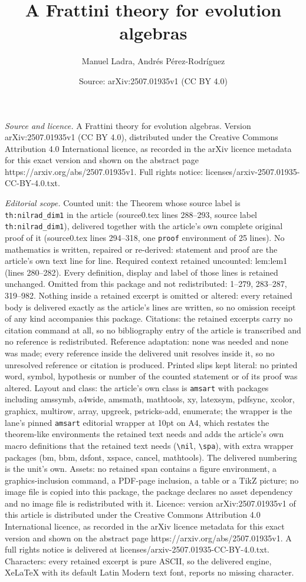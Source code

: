 \documentclass[10pt,a4paper]{amsart}
\title[A Frattini theory for evolution algebras]{A Frattini theory for evolution algebras}
\author{Manuel Ladra, Andr\'es P\'erez-Rodr\'iguez}
\date{Source: arXiv:2507.01935v1 (CC BY 4.0)}
\begin{document}
\maketitle

\noindent\emph{Source and licence.} A Frattini theory for evolution algebras. Version arXiv:2507.01935v1 (CC BY 4.0), distributed under the Creative Commons Attribution 4.0 International licence, as recorded in the arXiv licence metadata for this exact version and shown on the abstract page https://arxiv.org/abs/2507.01935v1. Full rights notice: licenses/arxiv-2507.01935-CC-BY-4.0.txt.\par\smallskip

\noindent\textit{Editorial scope.} Counted unit: the Theorem whose source label is \texttt{th:nilrad\_dim1} in the article (source0.tex lines 288--293, source label \texttt{th:nilrad\_dim1}), delivered together with the article's own complete original proof of it (source0.tex lines 294--318, one \texttt{proof} environment of 25 lines). No mathematics is written, repaired or re-derived: statement and proof are the article's own text line for line. Required context retained uncounted: lem:lem1 (lines 280--282). Every definition, display and label of those lines is retained unchanged. Omitted from this package and not redistributed: 1--279, 283--287, 319--982. Nothing inside a retained excerpt is omitted or altered: every retained body is delivered exactly as the article's lines are written, so no omission receipt of any kind accompanies this package. Citations: the retained excerpts carry no citation command at all, so no bibliography entry of the article is transcribed and no reference is redistributed. Reference adaptation: none was needed and none was made; every reference inside the delivered unit resolves inside it, so no unresolved reference or citation is produced. Printed slips kept literal: no printed word, symbol, hypothesis or number of the counted statement or of its proof was altered. Layout and class: the article's own class is \texttt{amsart} with packages including amssymb, a4wide, amsmath, mathtools, xy, latexsym, pdfsync, xcolor, graphicx, multirow, array, upgreek, pstricks-add, enumerate; the wrapper is the lane's pinned \texttt{amsart} editorial wrapper at 10pt on A4, which restates the theorem-like environments the retained text needs and adds the article's own macro definitions that the retained text needs (\texttt{\textbackslash nil}, \texttt{\textbackslash spa}), with extra wrapper packages (bm, bbm, dsfont, xspace, cancel, mathtools). The delivered numbering is the unit's own. Assets: no retained span contains a figure environment, a graphics-inclusion command, a PDF-page inclusion, a table or a TikZ picture; no image file is copied into this package, the package declares no asset dependency and no image file is redistributed with it. Licence: version arXiv:2507.01935v1 of this article is distributed under the Creative Commons Attribution 4.0 International licence, as recorded in the arXiv licence metadata for this exact version and shown on the abstract page https://arxiv.org/abs/2507.01935v1. A full rights notice is delivered at licenses/arxiv-2507.01935-CC-BY-4.0.txt. Characters: every retained excerpt is pure ASCII, so the delivered engine, XeLaTeX with its default Latin Modern text font, reports no missing character.
\end{document}
